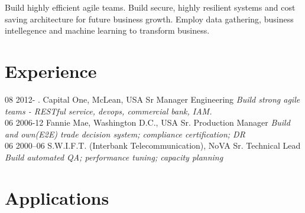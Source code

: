 \documentclass[]{friggeri-cv}
\begin{document}
Build highly efficient agile teams. Build secure, highly resilient systems and cost saving architecture for future business growth. Employ data gathering, business intellegence and machine learning to transform business.

\section{Experience}
\begin{entrylist}
  \entry
    {08 2012- .}
    {Capital One, McLean, USA}
    {Sr Manager Engineering}
    {\emph{Build strong agile teams - RESTful service, devops, commercial bank, IAM.}\\}
  \entry
    {06 2006-12}
    {Fannie Mae, Washington D.C., USA}
    {Sr. Production Manager}
    {\emph{Build and own(E2E) trade decision system; compliance certification; DR}\\}
  \entry
    {06 2000–06}
    {S.W.I.F.T.  (Interbank Telecommunication), NoVA}
    {Sr. Technical Lead}
    {\emph{Build automated QA; performance tuning; capacity planning}\\}
\end{entrylist}

\section{Applications}
\end{document}
